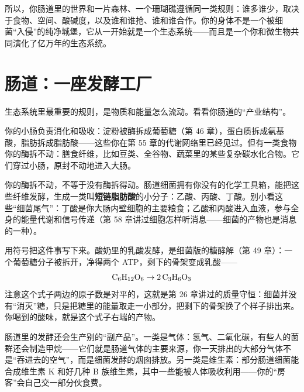 所以，你肠道里的世界和一片森林、一个珊瑚礁遵循同一类规则：谁多谁少，取决于食物、空间、酸碱度，以及谁和谁抢、谁和谁合作。你的身体不是一个被细菌“入侵”的纯净城堡，它从一开始就是一个生态系统——而且是一个你和微生物共同演化了亿万年的生态系统。

\section{肠道：一座发酵工厂}

生态系统里最重要的规则，是物质和能量怎么流动。看看你肠道的“产业结构”。

你的小肠负责消化和吸收：淀粉被酶拆成葡萄糖（第 46 章），蛋白质拆成氨基酸，脂肪拆成脂肪酸——这些你在第 55 章的代谢网络里已经见过。但有一类食物你的酶拆不动：膳食纤维，比如豆类、全谷物、蔬菜里的某些复杂碳水化合物。它们穿过小肠，原封不动地进入大肠。

你的酶拆不动，不等于没有酶拆得动。肠道细菌拥有你没有的化学工具箱，能把这些纤维发酵，生成一类叫\textbf{短链脂肪酸}的小分子：乙酸、丙酸、丁酸。别小看这些“细菌尾气”：丁酸是你大肠内壁细胞的主要粮食；乙酸和丙酸进入血液，参与全身的能量代谢和信号传递（第 58 章讲过细胞怎样听消息——细菌的产物也是消息的一种）。

用符号把这件事写下来。酸奶里的乳酸发酵，是细菌版的糖酵解（第 49 章）：一个葡萄糖分子被拆开，净得两个 ATP，剩下的骨架变成乳酸——
\[\mathrm{C_6H_{12}O_6} \rightarrow 2\,\mathrm{C_3H_6O_3}\]
注意这个式子两边的原子数是对平的，这就是第 26 章讲过的质量守恒：细菌并没有“消灭”糖，只是把糖里的能量取走一小部分，把剩下的骨架换了个样子排出来。你喝到的酸味，就是这个式子右端的产物。

肠道里的发酵还会生产别的“副产品”。一类是气体：氢气、二氧化碳，有些人的菌群还会制造甲烷——它们就是肠道气体的主要来源，你一天排出的大部分气体不是“吞进去的空气”，而是细菌发酵的烟囱排放。另一类是维生素：部分肠道细菌能合成维生素 K 和好几种 B 族维生素，其中一些能被人体吸收利用——你的“房客”会自己交一部分伙食费。

\begin{center}
\end{center}

